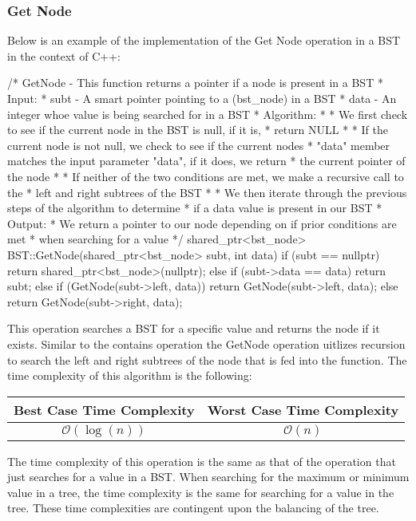 \begin{highlight}

\subsubsection*{Get Node}

Below is an example of the implementation of the Get Node operation in a BST in the context of C++:

\begin{code}
/*  GetNode - This function returns a pointer if a node is present in a BST
*   Input:
*     subt - A smart pointer pointing to a (bst_node) in a BST
*     data - An integer whoe value is being searched for in a BST
*   Algorithm:
*     * We first check to see if the current node in the BST is null, if it is, 
*       return NULL
*     * If the current node is not null, we check to see if the current nodes 
*       "data" member matches the input parameter "data", if it does, we return 
*       the current pointer of the node
*     * If neither of the two conditions are met, we make a recursive call to the 
*       left and right subtrees of the BST
*     * We then iterate through the previous steps of the algorithm to determine 
*       if a data value is present in our BST
*   Output:
*     We return a pointer to our node depending on if prior conditions are met 
*     when searching for a value
*/
shared_ptr<bst_node> BST::GetNode(shared_ptr<bst_node> subt, int data){
    if (subt == nullptr) {
        return shared_ptr<bst_node>(nullptr);
    }
    else if (subt->data == data) {
        return subt;
    }
    else {
    if (GetNode(subt->left, data)) {
        return GetNode(subt->left, data);
    }
    else {
        return GetNode(subt->right, data);
        }
    }
}
\end{code}

This operation searches a BST for a specific value and returns the node if it exists. Similar to the contains operation the GetNode operation uitlizes recursion to search the left and right subtrees
of the node that is fed into the function. The time complexity of this algorithm is the following: \newline

\begin{center}
    \begin{tabular}[ht]{|c|c|}
        \hline \textbf{Best Case Time Complexity} & \textbf{Worst Case Time Complexity} \\ \hline
        $\mathcal{O}(\log{(n)})$ & $\mathcal{O}(n)$ \\ \hline
    \end{tabular}
\end{center}

\noindent The time complexity of this operation is the same as that of the operation that just searches for a value in a BST. When searching for the maximum or minimum value in a tree, the time complexity
is the same for searching for a value in the tree. These time complexities are contingent upon the balancing of the tree.

\end{highlight}

